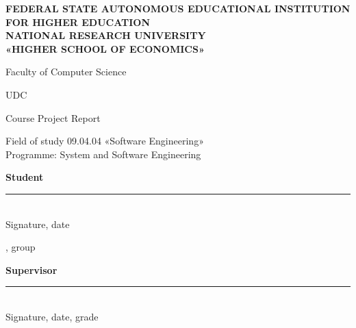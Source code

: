 \begin{titlepage}
\thispagestyle{empty}
\singlespacing
\setlength{\parindent}{0pt}
\setlength{\parskip}{0pt}

\begin{center}
\textbf{FEDERAL STATE AUTONOMOUS EDUCATIONAL INSTITUTION}\\
\textbf{FOR HIGHER EDUCATION}\\
\textbf{NATIONAL RESEARCH UNIVERSITY}\\
\textbf{«HIGHER SCHOOL OF ECONOMICS»}

\vspace{0.3cm}
Faculty of Computer Science
\end{center}

\vspace{0.4cm}
\noindent UDC~\hseUDC

\vspace{2cm}
\begin{center}
{\large\foreignlanguage{russian}{\hseAuthorName}}

\vspace{1.2cm}
{\large\textbf{\hseTitleEn}}

\vspace{0.4cm}
{\foreignlanguage{russian}{\hseTitleRu}}

\vspace{1.2cm}
Course Project Report

\vspace{0.3cm}
Field of study 09.04.04 «Software Engineering»\\
Programme: System and Software Engineering
\end{center}

\vfill
\noindent
\begin{minipage}[t]{0.42\textwidth}
\raggedright
\textbf{Student}\\[0.6cm]
%
\rule{5cm}{0.4pt}\\[-0.1cm]
{\scriptsize Signature, date}

\vspace{0.2cm}
\foreignlanguage{russian}{\hseAuthorName}, group \foreignlanguage{russian}{\hseGroup}
\end{minipage}
\hfill
\begin{minipage}[t]{0.5\textwidth}
\raggedright
\textbf{Supervisor}\\[0.6cm]
\rule{5cm}{0.4pt}\\[-0.1cm]
{\scriptsize Signature, date, grade}


\end{minipage}
\end{titlepage}
